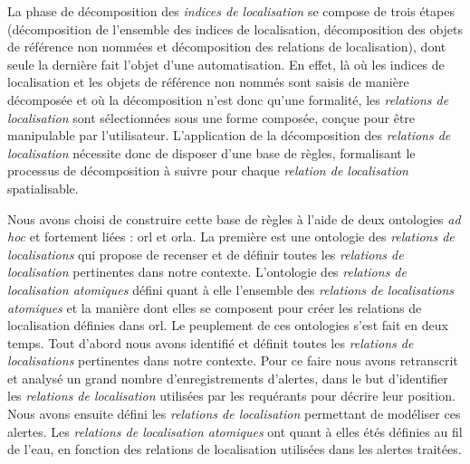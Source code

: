 La phase de décomposition des \emph{indices de localisation} se
compose de trois étapes (décomposition de l'ensemble des indices de
localisation, décomposition des objets de référence non nommées et
décomposition des relations de localisation), dont seule la dernière
fait l'objet d'une automatisation. En effet, là où les indices de
localisation et les objets de référence non nommés sont saisis de
manière décomposée et où la décomposition n'est donc qu'une formalité,
les \emph{relations de localisation} sont sélectionnées sous une forme
composée, conçue pour être manipulable par
l'utilisateur. L’application de la décomposition des \emph{relations
  de localisation} nécessite donc de disposer d'une base de règles,
formalisant le processus de décomposition à suivre pour chaque
\emph{relation de localisation} spatialisable.

Nous avons choisi de construire cette base de règles à l'aide de deux
ontologies \emph{ad hoc} et fortement liées : \ac{orl} et
\ac{orla}. La première est une ontologie des \emph{relations de
  localisations} qui propose de recenser et de définir toutes les
\emph{relations de localisation} pertinentes dans notre
contexte. L'ontologie des \emph{relations de localisation atomiques}
défini quant à elle l'ensemble des \emph{relations de localisations
  atomiques} et la manière dont elles se composent pour créer les
relations de localisation définies dans \ac{orl}. Le peuplement de ces
ontologies s'est fait en deux temps. Tout d'abord nous avons identifié
et définit toutes les \emph{relations de localisations} pertinentes
dans notre contexte. Pour ce faire nous avons retranscrit et analysé
un grand nombre d'enregistrements d'alertes, dans le but d'identifier
les \emph{relations de localisation} utilisées par les requérants pour
décrire leur position. Nous avons ensuite défini les \emph{relations
  de localisation} permettant de modéliser ces alertes. Les
\emph{relations de localisation atomiques} ont quant à elles étés
définies au fil de l'eau, en fonction des relations de localisation
utilisées dans les alertes traitées.

